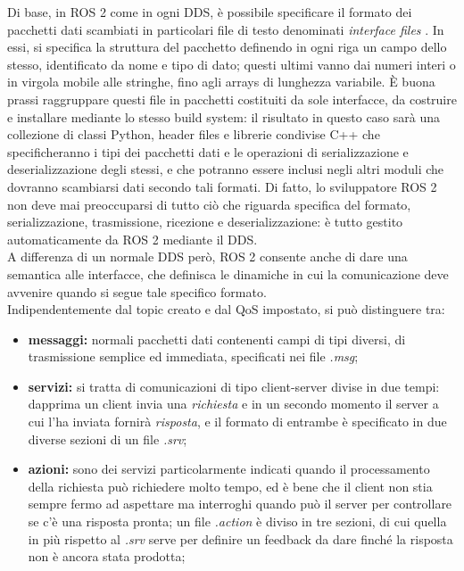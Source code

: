 \indent Di base, in ROS 2 come in ogni DDS, è possibile specificare il formato dei pacchetti dati scambiati in particolari file di testo denominati \emph{interface files} \cite{ros2_interface}. In essi, si specifica la struttura del pacchetto definendo in ogni riga un campo dello stesso, identificato da nome e tipo di dato; questi ultimi vanno dai numeri interi o in virgola mobile alle stringhe, fino agli arrays di lunghezza variabile. È buona prassi raggruppare questi file in pacchetti costituiti da sole interfacce, da costruire e installare mediante lo stesso build system: il risultato in questo caso sarà una collezione di classi Python, header files e librerie condivise C++ che specificheranno i tipi dei pacchetti dati e le operazioni di serializzazione e deserializzazione degli stessi, e che potranno essere inclusi negli altri moduli che dovranno scambiarsi dati secondo tali formati. Di fatto, lo sviluppatore ROS 2 non deve mai preoccuparsi di tutto ciò che riguarda specifica del formato, serializzazione, trasmissione, ricezione e deserializzazione: è tutto gestito automaticamente da ROS 2 mediante il DDS.\\
A differenza di un normale DDS però, ROS 2 consente anche di dare una semantica alle interfacce, che definisca le dinamiche in cui la comunicazione deve avvenire quando si segue tale specifico formato.\\
Indipendentemente dal topic creato e dal QoS impostato, si può distinguere tra:
\begin{itemize}
    \item \textbf{messaggi:} normali pacchetti dati contenenti campi di tipi diversi, di trasmissione semplice ed immediata, specificati nei file \emph{.msg};
    \item \textbf{servizi:} si tratta di comunicazioni di tipo client-server divise in due tempi: dapprima un client invia una \emph{richiesta} e in un secondo momento il server a cui l'ha inviata fornirà \emph{risposta}, e il formato di entrambe è specificato in due diverse sezioni di un file \emph{.srv};
    \item \textbf{azioni:} sono dei servizi particolarmente indicati quando il processamento della richiesta può richiedere molto tempo, ed è bene che il client non stia sempre fermo ad aspettare ma interroghi quando può il server per controllare se c'è una risposta pronta; un file \emph{.action} è diviso in tre sezioni, di cui quella in più rispetto al \emph{.srv} serve per definire un feedback da dare finché la risposta non è ancora stata prodotta;
\end{itemize}
